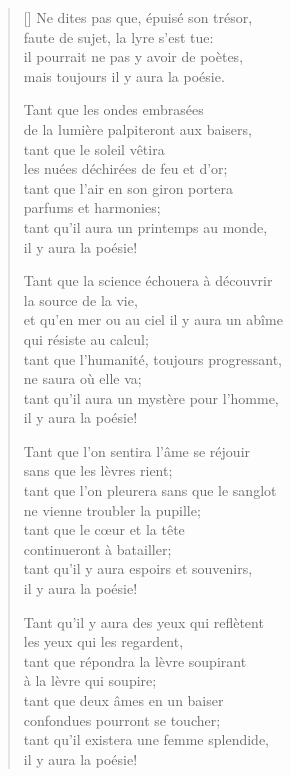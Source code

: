 \documentclass[a4paper,12pt]{book}
\begin{document}
\settowidth{\versewidth}{tant qu'il existera une femme splendide,}

\begin{verse}[\versewidth]
  Ne dites pas que, épuisé son trésor, \\
  faute de sujet, la lyre s'est tue: \\
  il pourrait ne pas y avoir de poètes, \\
  mais toujours il y aura la poésie.

  Tant que les ondes embrasées \\
  de la lumière palpiteront aux baisers, \\
  tant que le soleil vêtira \\
  les nuées déchirées de feu et d'or; \\
  tant que l'air en son giron portera \\
  parfums et harmonies; \\
  tant qu'il aura un printemps au monde, \\
  il y aura la poésie!

  Tant que la science échouera à découvrir \\
  la source de la vie, \\
  et qu'en mer ou au ciel il y aura un abîme \\
  qui résiste au calcul; \\
  tant que l'humanité, toujours progressant, \\
  ne saura où elle va; \\
  tant qu'il aura un mystère pour l'homme, \\
  il y aura la poésie!

  Tant que l'on sentira l'âme se réjouir \\
  sans que les lèvres rient; \\
  tant que l'on pleurera sans que le sanglot \\
  ne vienne troubler la pupille; \\
  tant que le c{\oe}ur et la tête \\
  continueront à batailler; \\
  tant qu'il y aura espoirs et souvenirs, \\
  il y aura la poésie!

  Tant qu'il y aura des yeux qui reflètent \\
  les yeux qui les regardent, \\
  tant que répondra la lèvre soupirant \\
  à la lèvre qui soupire; \\
  tant que deux âmes en un baiser \\
  confondues pourront se toucher; \\
  tant qu'il existera une femme splendide, \\
  il y aura la poésie!
\end{verse}
\end{document}
